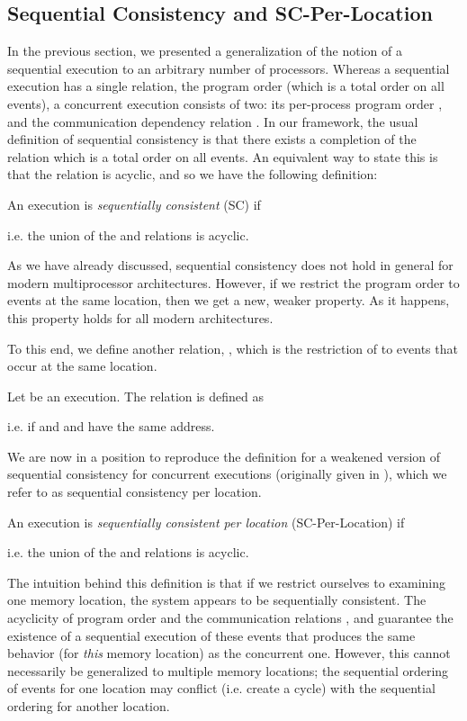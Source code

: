 \documentclass[]{eptcs}
\newenvironment{definition}[1][Definition.]{\begin{trivlist}
\item[\hskip \labelsep {\bfseries #1}]}{\end{trivlist}}
\begin{document}
\subsection{Sequential Consistency and SC-Per-Location}\label{sc-per-location-section}

In the previous section, we presented a generalization of the notion of a sequential execution to an arbitrary number of processors. Whereas a sequential execution has a single relation, the program order (which is a total order on all events), a concurrent execution consists of two: its per-process program order , and the communication dependency relation . In our framework, the usual definition of sequential consistency \cite{lamport79} is that there exists a completion of the relation  which is a total order on all events. An equivalent way to state this is that the relation  is acyclic, and so we have the following definition:
\begin{definition}
An execution  is \emph{sequentially consistent} (SC) if 

i.e. the union of the  and  relations is acyclic.
\end{definition}
As we have already discussed, sequential consistency does not hold in general for modern multiprocessor architectures. However, if we restrict the program order  to events at the same location, then we get a new, weaker property. As it happens, this property holds for all modern architectures.

To this end, we define another relation, , which is the restriction of  to events that occur at the same location.

\begin{definition}
Let  be an execution. The relation  is defined as

i.e.  if  and  and  have the same address.
\end{definition}

We are now in a position to reproduce the definition for a weakened version of sequential consistency for concurrent executions (originally given in \cite{alglave_cats}), which we refer to as sequential consistency per location.

\begin{definition}
An execution  is \emph{sequentially consistent per location} (SC-Per-Location) if 

i.e. the union of the  and  relations is acyclic.
\end{definition}

The intuition behind this definition is that if we restrict ourselves to examining one memory location, the system appears to be sequentially consistent. The acyclicity of program order and the communication relations ,  and  guarantee the existence of a sequential execution of these events that produces the same behavior (for \emph{this} memory location) as the concurrent one. However, this cannot necessarily be generalized to multiple memory locations; the sequential ordering of events for one location may conflict (i.e. create a cycle) with the sequential ordering for another location.
\end{document}
